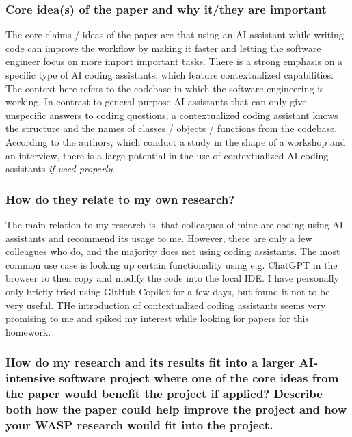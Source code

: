 \documentclass[11pt]{article}
\begin{document}
\subsubsection{Core idea(s) of the paper and why it/they are important}

The core claims / ideas of the paper are that using an AI assistant while writing code can improve the workflow by making it faster and letting the software engineer focus on more import important tasks. There is a strong emphasis on a specific type of AI coding assistants, which feature contextualized capabilities. The context here refers to the codebase in which the software engineering is working. In contrast to general-purpose AI assistants that can only give unspecific answers to coding questions, a contextualized coding assistant knows the structure and the names of classes / objects / functions from the codebase. 
According to the authors, which conduct a study in the shape of a workshop and an interview, there is a large potential in the use of contextualized AI coding assistants \textit{if used properly}.

\subsubsection{How do they relate to my own research?}

The main relation to my research is, that colleagues of mine are coding using AI assistants and recommend its usage to me. However, there are only a few colleagues who do, and the majority does not using coding assistants. 
The most common use case is looking up certain functionality using e.g. ChatGPT in the browser to then copy and modify the code into the local IDE. 
I have personally only briefly tried using GitHub Copilot for a few days, but found it not to be very useful. 
THe introduction of contextualized coding assistants seems very promising to me and spiked my interest while looking for papers for this homework. 

\subsubsection{How do my research and its results fit into a larger AI-intensive software project where one of the core ideas from the paper would benefit the project if applied? Describe both how the paper could help improve the project and how your WASP research would fit into the project.}
\end{document}
